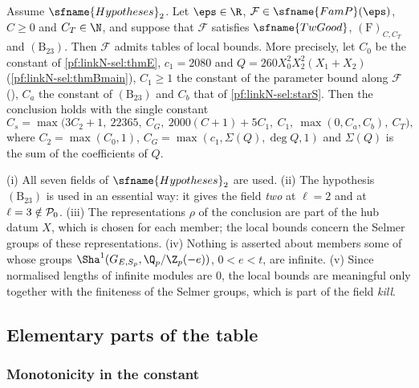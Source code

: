 \begin{theorem}\label{pf:linkN-sel:main}
Assume $\sfname{Hypotheses}_2$. Let $\eps\in\R$, $\mathcal F\in\sfname{FamP}(\eps)$, $C\ge0$ and $C_T\in\N$, and suppose that
$\mathcal F$ satisfies $\sfname{TwGood}$, $(\mathrm F)_{C,C_T}$ and $(\mathrm B_{23})$. Then $\mathcal F$ admits tables of local bounds.
More precisely, let $C_0$ be the constant of \cref{pf:linkN-sel:thmE}, $c_1=2080$ and $Q=260X_0^2X_2^2(X_1+X_2)$
(\cref{pf:linkN-sel:thmBmain}), $C_1\ge1$ the constant of the parameter bound along $\mathcal F$
(), $C_a$ the constant of
$(\mathrm B_{23})$ and $C_b$ that of \cref{pf:linkN-sel:starS}. Then the conclusion holds with the single constant
\begin{equation}\label{eq:pf:linkN-sel:Cs}
C_s=\max\bigl(3C_2+1,\ 22365,\ C_G,\ 2000(C+1)+5C_1,\ C_1,\ \max(0,C_a,C_b),\ C_T\bigr),
\end{equation}
where $C_2=\max(C_0,1)$, $C_G=\max(c_1,\Sigma(Q),\deg Q,1)$ and $\Sigma(Q)$ is the sum of the coefficients of $Q$.
\end{theorem}

\begin{remark}\label{pf:linkN-sel:remmain}
(i) All seven fields of $\sfname{Hypotheses}_2$ are used. (ii) The hypothesis $(\mathrm B_{23})$ is used in an essential way: it gives the
field \emph{two} at $\ell=2$ and at $\ell=3\notin\mathcal P_0$. (iii) The representations $\rho$ of the conclusion are part of
the hub datum $X$, which is chosen for each member; the local bounds concern the Selmer groups of these representations.
(iv) Nothing is asserted about members some of whose groups $\Sha^1(G_{E,S_p},\Q_p/\Z_p(-e))$, $0<e<t$, are infinite. (v) Since normalised
lengths of infinite modules are $0$, the local bounds are meaningful only together with the finiteness of the Selmer groups, which is
part of the field \emph{kill}.
\end{remark}

\subsection{Elementary parts of the table}\label{sec:pf:linkN-sel:elem}

\subsubsection{Monotonicity in the constant}

